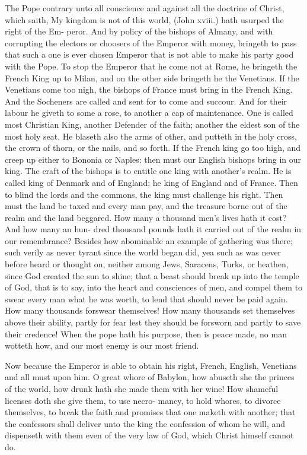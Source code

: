 \documentclass{custom}
\begin{document}
The Pope contrary unto all conscience and against all 
the doctrine of Christ, which saith, My kingdom is not of 
this world, (John xviii.) hath usurped the right of the Em- 
peror. And by policy of the bishops of Almany, and 
with corrupting the electors or choosers of the Emperor 
with money, bringeth to pass that such a one is ever chosen 
Emperor that is not able to make his party good with the 
Pope. To stop the Emperor that he come not at Rome,
he bringeth the French King up to Milan, and on the 
other side bringeth he the Venetians. If the Venetians 
come too nigh, the bishops of France must bring in the 
French King. And the Socheners are called and sent for 
to come and succour. And for their labour he giveth to 
some a rose, to another a cap of maintenance. One is 
called most Christian King, another Defender of the faith;
another the eldest son of the most holy seat. He blaseth 
also the arms of other, and putteth in the holy cross, the 
crown of thorn, or the nails, and so forth. If the French 
king go too high, and creep up either to Bononia or 
Naples: then must our English bishops bring in our king. 
The craft of the bishops is to entitle one king with another's 
realm. He is called king of Denmark and of England;
he king of England and of France. Then to blind the lords 
and the commons, the king must challenge his right. Then 
must the land be taxed and every man pay, and the treasure 
borne out of the realm and the land beggared. How many a 
thousand men's lives hath it cost? And how many an hun- 
dred thousand pounds hath it carried out of the realm in our 
remembrance? Besides how abominable an example of 
gathering was there; such verily as never tyrant since the 
world began did, yea such as was never before heard or 
thought on, neither among Jews, Saracens, Turks, or 
heathen, since God created the sun to shine; that a beast 
should break up into the temple of God, that is to say, 
into the heart and consciences of men, and compel them 
to swear every man what he was worth, to lend that should 
never be paid again. How many thousands forswear 
themselves! How many thousands set themselves above 
their ability, partly for fear lest they should be forsworn 
and partly to save their credence! When the pope hath 
his purpose, then is peace made, no man wotteth how, 
and our most enemy is our most friend.

Now because the Emperor is able to obtain his right, 
French, English, Venetians and all must upon him. O 
great whore of Babylon, how abuseth she the princes of 
the world, how drunk hath she made them with her wine!
How shameful licenses doth she give them, to use necro- 
mancy, to hold whores, to divorce themselves, to break the 
faith and promises that one maketh with another; that the 
confessors shall deliver unto the king the confession of 
whom he will, and dispenseth with them even of the very 
law of God, which Christ himself cannot do. 
\end{document}
